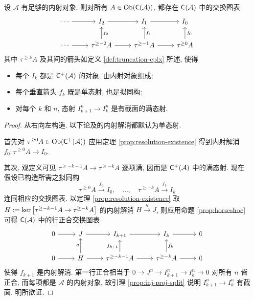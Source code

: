 \begin{lemma}\label{prop:K-injective-truncated}
	设 $\mathcal{A}$ 有足够的内射对象, 则对所有 $A \in \operatorname{Ob}(\mathsf{C}(\mathcal{A}))$, 都存在 $\mathsf{C}(\mathcal{A})$ 中的交换图表
	\[\begin{tikzcd}
		\cdots \arrow[r] & I_2 \arrow[r] & I_1 \arrow[r] & I_0 \\
		\cdots \arrow[r] & \tau^{\geq -2} A\arrow[u, "f_2"'] \arrow[r] & \tau^{\geq -1} A \arrow[r] \arrow[u, "f_1"'] & \tau^{\geq 0} A \arrow[u, "f_0"']
	\end{tikzcd}\]
	其中 $\tau^{\geq k} A$ 及其间的箭头如定义 \ref{def:truncation-cplx} 所述, 使得
	\begin{itemize}
		\item 每个 $I_k$ 都是 $\mathsf{C}^+(\mathcal{A})$ 的对象, 由内射对象组成;
		\item 每个垂直箭头 $f_k$ 既是单态射, 也是拟同构;
		\item 对每个 $k$ 和 $n$, 态射 $I_{k+1}^n \to I_k^n$ 是有截面的满态射.
	\end{itemize}
\end{lemma}
\begin{proof}
	从右向左构造. 以下论及的内射解消都默认为单态射.

	首先对 $\tau^{\geq 0} A \in \operatorname{Ob}(\mathsf{C}^+(\mathcal{A}))$ 应用定理 \ref{prop:resolution-existence} 得到内射解消 $f_0: \tau^{\geq 0} A \to I_0$.

	其次, 观定义可见 $\tau^{\geq -k-1} A \to \tau^{\geq -k} A$ 逐项满, 因而是 $\mathsf{C}^+(\mathcal{A})$ 中的满态射. 现在假设已构造所需之拟同构
	\[ \tau^{\geq 0} A \xrightarrow{f_0} I_0, \quad \ldots, \quad \tau^{\geq -k} A \xrightarrow{f_k} I_k \]
	连同相应的交换图表. 以定理 \ref{prop:resolution-existence} 取 $H := \operatorname{ker}\left[ \tau^{\geq -k-1} A \to \tau^{\geq -k} A \right]$ 的内射解消 $H \xrightarrow{g} J$, 则应用命题 \ref{prop:horseshoe} 可得 $\mathsf{C}(\mathcal{A})$ 中的行正合交换图表
	\[\begin{tikzcd}
		0 \arrow[r] & J \arrow[r] & I_{k+1} \arrow[r] & I_k \arrow[r] & 0 \\
		0 \arrow[r] & H \arrow[r] \arrow[u, "g"] & \tau^{\geq -k-1} A \arrow[u, "{f_{k+1}}"] \arrow[r] & \tau^{\geq -k} A \arrow[r] \arrow[u, "f_k"'] & 0
	\end{tikzcd}\]
	使得 $f_{k+1}$ 是内射解消. 第一行正合相当于 $0 \to J^n \to I_{k+1}^n \to I_k^n \to 0$ 对所有 $n$ 皆正合, 而每项都是 $\mathcal{A}$ 的内射对象, 故引理 \ref{prop:inj-proj-split} 说明 $I_{k+1}^n \to I_k^n$ 有截面. 明所欲证.
\end{proof}

